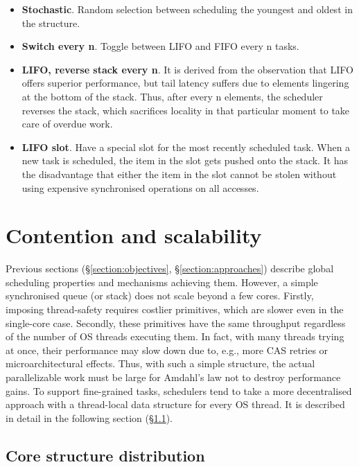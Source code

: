 \documentclass[12pt,a4paper,twoside]{report}
\begin{document}
\begin{itemize}
    \item \textbf{Stochastic}. Random selection between scheduling the youngest and oldest in the structure. 
    \item \textbf{Switch every n}. Toggle between LIFO and FIFO every n tasks.
    \item \textbf{LIFO, reverse stack every n}. It is derived from the observation that LIFO offers superior performance, but tail latency suffers due to elements lingering at the bottom of the stack. Thus, after every n elements, the scheduler reverses the stack, which sacrifices locality in that particular moment to take care of overdue work.    
    \item \textbf{LIFO slot}. Have a special slot for the most recently scheduled task. When a new task is scheduled, the item in the slot gets pushed onto the stack. It has the disadvantage that either the item in the slot cannot be stolen without using expensive synchronised operations on all accesses.
\end{itemize}


\section{Contention and scalability}
\label{section:global_local}

Previous sections (\S\ref{section:objectives}, \S\ref{section:approaches}) describe global scheduling properties and mechanisms achieving them. However, a simple synchronised queue (or stack) does not scale beyond a few cores. Firstly, imposing thread-safety requires costlier primitives, which are slower even in the single-core case. Secondly, these primitives have the same throughput regardless of the number of OS threads executing them. In fact, with many threads trying at once, their performance may slow down due to, e.g., more CAS retries or microarchitectural effects. Thus, with such a simple structure, the actual parallelizable work must be large for Amdahl's law \cite{amdahl} not to destroy performance gains. To support fine-grained tasks, schedulers tend to take a more decentralised approach with a thread-local data structure for every OS thread. It is described in detail in the following section (\S\ref{section:core_struct_dist}).

\subsection{Core structure distribution}
\label{section:core_struct_dist}
\end{document}
